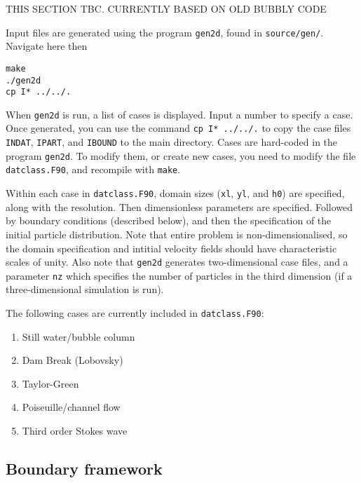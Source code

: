 \documentclass[notitlepage]{revtex4-1}
\begin{document}
THIS SECTION TBC. CURRENTLY BASED ON OLD BUBBLY CODE

Input files are generated using the program \verb|gen2d|, found in \verb|source/gen/|. Navigate here then
\begin{verbatim}
make
./gen2d
cp I* ../../.
\end{verbatim}
When \verb|gen2d| is run, a list of cases is displayed. Input a number to specify a case. Once generated, you can use the command \verb|cp I* ../../.| to copy the case files \verb|INDAT|, \verb|IPART|, and \verb|IBOUND| to the main directory. Cases are hard-coded in the program \verb|gen2d|. To modify them, or create new cases, you need to modify the file \verb|datclass.F90|, and recompile with \verb|make|.

Within each case in \verb|datclass.F90|, domain sizes (\verb|xl|, \verb|yl|, and \verb|h0|) are specified, along with the resolution. Then dimensionless parameters are specified. Followed by boundary conditions (described below), and then the specification of the initial particle distribution. Note that entire problem is non-dimensionalised, so the domain specification and intitial velocity fields should have characteristic scales of unity. Also note that \verb|gen2d| generates two-dimensional case files, and a parameter \verb|nz| which specifies the number of particles in the third dimension (if a three-dimensional simulation is run).

The following cases are currently included in \verb|datclass.F90|:
\begin{enumerate}
\item Still water/bubble column
\item Dam Break (Lobovsky)
\item Taylor-Green
\item Poiseuille/channel flow
\item Third order Stokes wave
\end{enumerate}

\subsection{Boundary framework}
\end{document}
